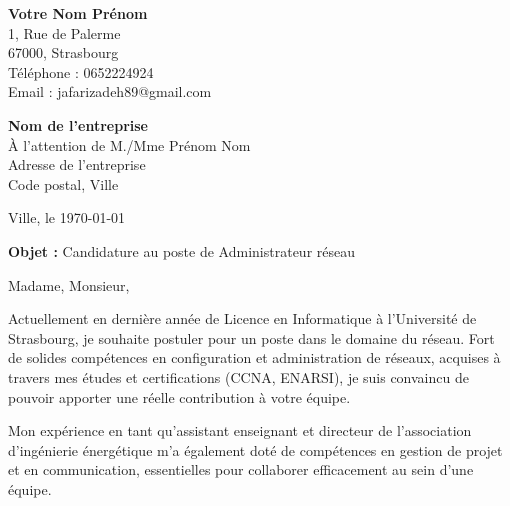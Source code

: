 \documentclass[11pt,a4paper]{letter}
\begin{document}
\begin{flushleft}
\textbf{Votre Nom Prénom} \\
1, Rue de Palerme \\
67000, Strasbourg \\
Téléphone : 0652224924 \\
Email : jafarizadeh89@gmail.com \\
\end{flushleft}

\vspace{1cm}

\begin{flushright}
\textbf{Nom de l'entreprise} \\
À l'attention de M./Mme Prénom Nom \\
Adresse de l'entreprise \\
Code postal, Ville \\
\end{flushright}

\vspace{1cm}

\begin{flushright}
Ville, le \today
\end{flushright}

\vspace{1cm}

\noindent\textbf{Objet :} Candidature au poste de Administrateur réseau

\vspace{1cm}

Madame, Monsieur,

\vspace{0.5cm}

Actuellement en dernière année de Licence en Informatique à l’Université de Strasbourg, je souhaite postuler pour un poste dans le domaine du réseau. Fort de solides compétences en configuration et administration de réseaux, acquises à travers mes études et certifications (CCNA, ENARSI), je suis convaincu de pouvoir apporter une réelle contribution à votre équipe.

\vspace{0.5cm}

Mon expérience en tant qu'assistant enseignant et directeur de l'association d'ingénierie énergétique m'a également doté de compétences en gestion de projet et en communication, essentielles pour collaborer efficacement au sein d'une équipe.
\end{document}
